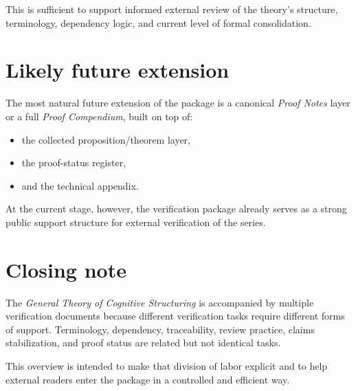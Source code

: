 \documentclass[12pt]{article}
\begin{document}
	This is sufficient to support informed external review of the theory's structure, terminology,
	dependency logic, and current level of formal consolidation.
	
	\section{Likely future extension}
	
	The most natural future extension of the package is a canonical \emph{Proof Notes} layer or a
	full \emph{Proof Compendium}, built on top of:
	\begin{itemize}[leftmargin=2em]
		\item the collected proposition/theorem layer,
		\item the proof-status register,
		\item and the technical appendix.
	\end{itemize}
	
	At the current stage, however, the verification package already serves as a strong public
	support structure for external verification of the series.
	
	\section{Closing note}
	
	The \emph{General Theory of Cognitive Structuring} is accompanied by multiple verification
	documents because different verification tasks require different forms of support. Terminology, dependency, traceability, review practice, claims stabilization, and proof status are related but not identical tasks.
	
	This overview is intended to make that division of labor explicit and to help external readers	enter the package in a controlled and efficient way.
	
\end{document}
